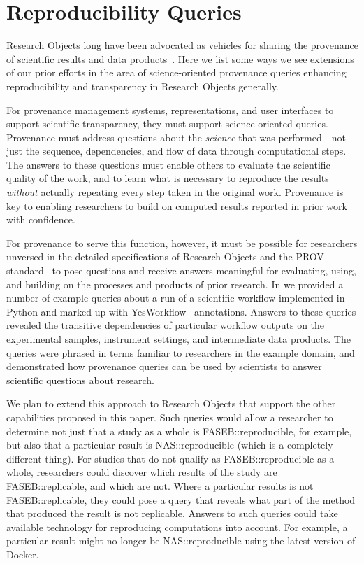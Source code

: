\section{Reproducibility Queries}\label{sec-transparency}

Research Objects long have been advocated as vehicles for sharing the
	provenance of scientific results and data products~\cite{bechhofer2013whya}.
Here we list some ways we see extensions of our prior efforts in the area
	of science-oriented provenance queries
    enhancing reproducibility and transparency in
	Research Objects generally.

For provenance management systems, representations, and user interfaces to support
	scientific transparency, they must support science-oriented queries.
Provenance must address questions about the \emph{science} that was performed---not just the
	sequence, dependencies, and flow of data through computational steps.
The answers to these questions must enable others to evaluate the scientific quality of the work,
	and to learn what is necessary to
	reproduce the results \emph{without} actually repeating every step taken in the original work.
Provenance is key to enabling researchers to build on computed results reported in prior work with confidence.

For provenance to serve this function, however, it must be possible for researchers unversed in the detailed
	specifications of Research Objects and the PROV standard~\cite{groth2013provoverviewa} to pose
	questions and receive answers meaningful for evaluating, using, and building on the
	processes and products of prior research.
In \cite{mcphillips2015retrospective} we provided a number of example queries about a run of a scientific
	workflow implemented in Python and marked up with YesWorkflow~\cite{mcphillips2015yesworkflowa} annotations.
Answers to these queries revealed the transitive dependencies of particular workflow outputs
	on the experimental samples, instrument settings, and intermediate data products.
The queries were phrased in terms familiar to researchers in the example domain,
	and demonstrated how provenance queries can be used by scientists
	to answer scientific questions about research.

We plan to extend this approach to Research Objects that support the other capabilities
	proposed in this paper.
Such queries would allow a researcher to determine not just that a study as a whole
	is \textsf{FASEB::reproducible}, for example, but also that a particular result
	is \textsf{NAS::reproducible} (which is a completely different thing).
For studies that do not qualify as \textsf{FASEB::reproducible} as a whole, researchers
	could discover which results of the study are \textsf{FASEB::replicable}, and which are not.
Where a particular results is not \textsf{FASEB::replicable}, they could pose a query
	that reveals what part of the method that produced the result is
	not replicable.
Answers to such queries could take available technology for reproducing computations
	into account.
For example, a particular result might no longer be NAS::reproducible using the
	latest version of Docker.
